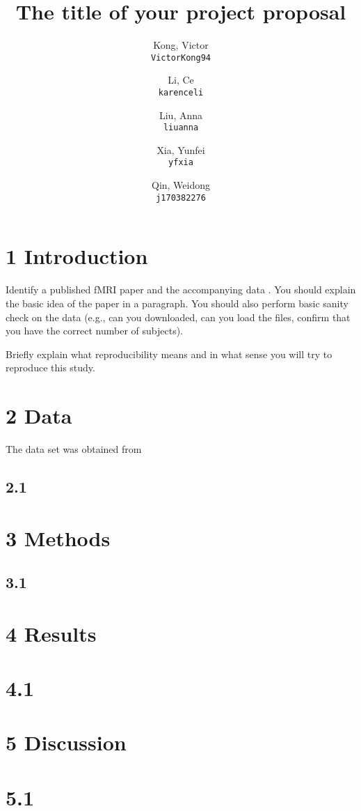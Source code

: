 \documentclass[11pt]{article}
\title{The title of your project proposal}
\author{
  Kong, Victor\\
  \texttt{VictorKong94}
  \and
  Li, Ce\\
  \texttt{karenceli}
  \and
  Liu, Anna\\
  \texttt{liuanna}
  \and
  Xia, Yunfei\\
  \texttt{yfxia}
  \and
  Qin, Weidong\\
  \texttt{j170382276}
}
\begin{document}
\maketitle


\section{1 Introduction}

Identify a published fMRI paper and the accompanying data
\cite{lindquist2008statistical}.  You should explain the basic idea of the
paper in a paragraph.  You should also perform basic sanity check on the data
(e.g., can you downloaded, can you load the files, confirm that you have the
correct number of subjects).

Briefly explain what reproducibility means and in what sense you will
try to reproduce this study.

\section{2 Data}

The data set was obtained from 

\subsection{2.1}

\section{3 Methods}

\subsection{3.1}

\section{4 Results}

\section{4.1}

\section{5 Discussion}

\section{5.1}


\end{document}
